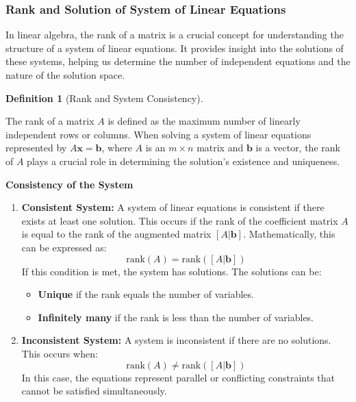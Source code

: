 \documentclass[
  letterpaper,
  DIV=11,
  numbers=noendperiod]{scrreprt}
\providecommand{\tightlist}{%
  \setlength{\itemsep}{0pt}\setlength{\parskip}{0pt}}\usepackage{longtable,booktabs,array}
\theoremstyle{plain}
\theoremstyle{definition}
\newtheorem{definition}{Definition}[chapter]
\theoremstyle{remark}
\begin{document}
\subsubsection{Rank and Solution of System of Linear
Equations}\label{rank-and-solution-of-system-of-linear-equations}

In linear algebra, the rank of a matrix is a crucial concept for
understanding the structure of a system of linear equations. It provides
insight into the solutions of these systems, helping us determine the
number of independent equations and the nature of the solution space.

\begin{definition}[Rank and System
Consistency]\protect\hypertarget{def-soln}{}\label{def-soln}

The rank of a matrix \(A\) is defined as the maximum number of linearly
independent rows or columns. When solving a system of linear equations
represented by \(A\mathbf{x} = \mathbf{b}\), where \(A\) is an
\(m \times n\) matrix and \(\mathbf{b}\) is a vector, the rank of \(A\)
plays a crucial role in determining the solution's existence and
uniqueness.

\textbf{Consistency of the System}

\begin{enumerate}
\def\labelenumi{\arabic{enumi}.}
\tightlist
\item
  \textbf{Consistent System:} A system of linear equations is consistent
  if there exists at least one solution. This occurs if the rank of the
  coefficient matrix \(A\) is equal to the rank of the augmented matrix
  \([A|\mathbf{b}]\). Mathematically, this can be expressed as:
  \[\text{rank}(A) = \text{rank}([A|\mathbf{b}])\] If this condition is
  met, the system has solutions. The solutions can be:

  \begin{itemize}
  \tightlist
  \item
    \textbf{Unique} if the rank equals the number of variables.
  \item
    \textbf{Infinitely many} if the rank is less than the number of
    variables.
  \end{itemize}
\item
  \textbf{Inconsistent System:} A system is inconsistent if there are no
  solutions. This occurs when:
  \[\text{rank}(A) \ne \text{rank}([A|\mathbf{b}])\] In this case, the
  equations represent parallel or conflicting constraints that cannot be
  satisfied simultaneously.
\end{enumerate}

\end{definition}
\end{document}
